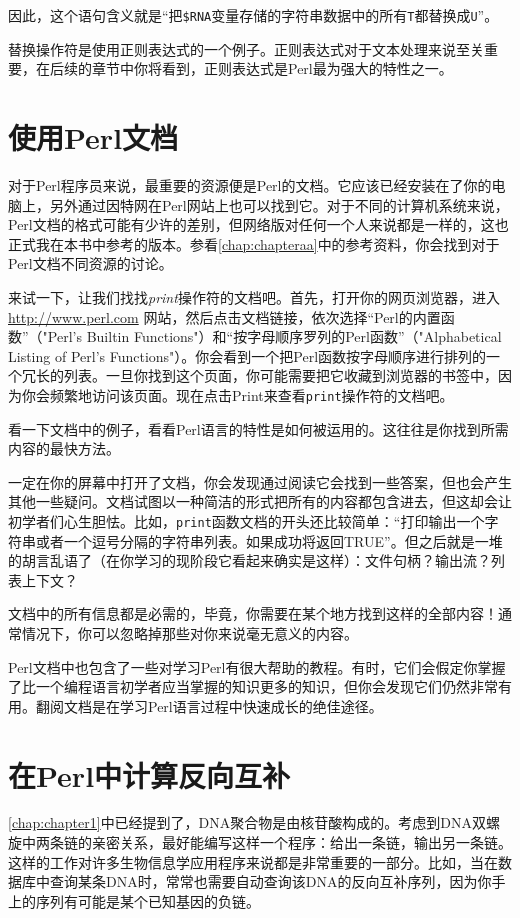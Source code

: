因此，这个语句含义就是“把\verb|$RNA|变量存储的字符串数据中的所有\verb|T|都替换成\verb|U|”。

替换操作符是使用正则表达式的一个例子。正则表达式对于文本处理来说至关重要，在后续的章节中你将看到，正则表达式是Perl最为强大的特性之一。

\section{使用Perl文档}
对于Perl程序员来说，最重要的资源便是Perl的文档。它应该已经安装在了你的电脑上，另外通过因特网在Perl网站上也可以找到它。对于不同的计算机系统来说，Perl文档的格式可能有少许的差别，但网络版对任何一个人来说都是一样的，这也正式我在本书中参考的版本。参看\autoref{chap:chapteraa}中的参考资料，你会找到对于Perl文档不同资源的讨论。

来试一下，让我们找找\textit{print}操作符的文档吧。首先，打开你的网页浏览器，进入 \href{http://www.perl.com}{http://www.perl.com} 网站，然后点击文档链接，依次选择“Perl的内置函数”（"Perl's Builtin Functions"）和“按字母顺序罗列的Perl函数”（"Alphabetical Listing of Perl's Functions"）。你会看到一个把Perl函数按字母顺序进行排列的一个冗长的列表。一旦你找到这个页面，你可能需要把它收藏到浏览器的书签中，因为你会频繁地访问该页面。现在点击Print来查看\verb|print|操作符的文档吧。

看一下文档中的例子，看看Perl语言的特性是如何被运用的。这往往是你找到所需内容的最快方法。

一定在你的屏幕中打开了文档，你会发现通过阅读它会找到一些答案，但也会产生其他一些疑问。文档试图以一种简洁的形式把所有的内容都包含进去，但这却会让初学者们心生胆怯。比如，\verb|print|函数文档的开头还比较简单：“打印输出一个字符串或者一个逗号分隔的字符串列表。如果成功将返回TRUE”。但之后就是一堆的胡言乱语了（在你学习的现阶段它看起来确实是这样）：文件句柄？输出流？列表上下文？

文档中的所有信息都是必需的，毕竟，你需要在某个地方找到这样的全部内容！通常情况下，你可以忽略掉那些对你来说毫无意义的内容。

Perl文档中也包含了一些对学习Perl有很大帮助的教程。有时，它们会假定你掌握了比一个编程语言初学者应当掌握的知识更多的知识，但你会发现它们仍然非常有用。翻阅文档是在学习Perl语言过程中快速成长的绝佳途径。

\section{在Perl中计算反向互补}
\autoref{chap:chapter1}中已经提到了，DNA聚合物是由核苷酸构成的。考虑到DNA双螺旋中两条链的亲密关系，最好能编写这样一个程序：给出一条链，输出另一条链。这样的工作对许多生物信息学应用程序来说都是非常重要的一部分。比如，当在数据库中查询某条DNA时，常常也需要自动查询该DNA的反向互补序列，因为你手上的序列有可能是某个已知基因的负链。

